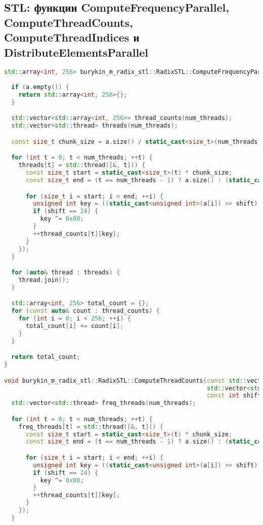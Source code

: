 \documentclass[12pt]{article}
\begin{document}
\subsection*{STL: функции ComputeFrequencyParallel, ComputeThreadCounts, ComputeThreadIndices и DistributeElementsParallel}
\begin{lstlisting}[language=C++]
std::array<int, 256> burykin_m_radix_stl::RadixSTL::ComputeFrequencyParallel(const std::vector<int>& a, const int shift,
                                                                             int num_threads) {
  if (a.empty()) {
    return std::array<int, 256>{};
  }

  std::vector<std::array<int, 256>> thread_counts(num_threads);
  std::vector<std::thread> threads(num_threads);

  const size_t chunk_size = a.size() / static_cast<size_t>(num_threads);

  for (int t = 0; t < num_threads; ++t) {
    threads[t] = std::thread([&, t]() {
      const size_t start = static_cast<size_t>(t) * chunk_size;
      const size_t end = (t == num_threads - 1) ? a.size() : (static_cast<size_t>(t) + 1) * chunk_size;

      for (size_t i = start; i < end; ++i) {
        unsigned int key = ((static_cast<unsigned int>(a[i]) >> shift) & 0xFFU);
        if (shift == 24) {
          key ^= 0x80;
        }
        ++thread_counts[t][key];
      }
    });
  }

  for (auto& thread : threads) {
    thread.join();
  }

  std::array<int, 256> total_count = {};
  for (const auto& count : thread_counts) {
    for (int i = 0; i < 256; ++i) {
      total_count[i] += count[i];
    }
  }

  return total_count;
}

void burykin_m_radix_stl::RadixSTL::ComputeThreadCounts(const std::vector<int>& a,
                                                        std::vector<std::array<int, 256>>& thread_counts,
                                                        const int shift, int num_threads, size_t chunk_size) {
  std::vector<std::thread> freq_threads(num_threads);

  for (int t = 0; t < num_threads; ++t) {
    freq_threads[t] = std::thread([&, t]() {
      const size_t start = static_cast<size_t>(t) * chunk_size;
      const size_t end = (t == num_threads - 1) ? a.size() : (static_cast<size_t>(t) + 1) * chunk_size;

      for (size_t i = start; i < end; ++i) {
        unsigned int key = ((static_cast<unsigned int>(a[i]) >> shift) & 0xFFU);
        if (shift == 24) {
          key ^= 0x80;
        }
        ++thread_counts[t][key];
      }
    });
  }


\end{lstlisting}
\end{document}
